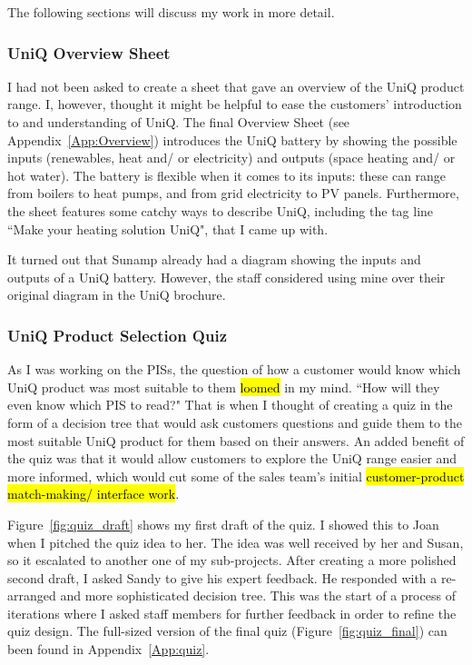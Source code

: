 The following sections will discuss my work in more detail.



\subsubsection{UniQ Overview Sheet}

I had not been asked to create a sheet that gave an overview of the UniQ product range.
I, however, thought it might be helpful to ease the customers' introduction to and understanding of UniQ.
The final Overview Sheet (see Appendix~\ref{App:Overview}) introduces the UniQ battery by showing the possible inputs (renewables, heat and/ or electricity) and outputs (space heating and/ or hot water).
The battery is flexible when it comes to its inputs: these can range from boilers to heat pumps, and from grid electricity to PV panels.
Furthermore, the sheet features some catchy ways to describe UniQ, including the tag line ``Make your heating solution UniQ", that I came up with.

It turned out that Sunamp already had a diagram showing the inputs and outputs of a UniQ battery.
However, the staff considered using mine over their original diagram in the UniQ brochure.



\subsubsection{UniQ Product Selection Quiz} \label{sec:quiz}

As I was working on the PISs, the question of how a customer would know which UniQ product was most suitable to them \hl{loomed} in my mind.
``How will they even know which PIS to read?"
That is when I thought of creating a quiz in the form of a decision tree that would ask customers questions and guide them to the most suitable UniQ product for them based on their answers.
An added benefit of the quiz was that it would allow customers to explore the UniQ range easier and more informed, which would cut some of the sales team's initial \hl{customer-product match-making/ interface work}.

Figure~\ref{fig:quiz_draft} shows my first draft of the quiz.
I showed this to Joan when I pitched the quiz idea to her.
The idea was well received by her and Susan, so it escalated to another one of my sub-projects.
After creating a more polished second draft, I asked Sandy to give his expert feedback.
He responded with a re-arranged and more sophisticated decision tree.
This was the start of a process of iterations where I asked staff members for further feedback in order to refine the quiz design.
The full-sized version of the final quiz (Figure~\ref{fig:quiz_final}) can been found in Appendix~\ref{App:quiz}.


